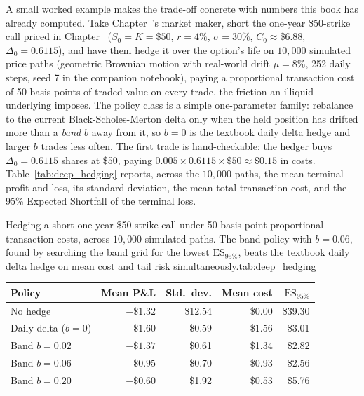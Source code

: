 \documentclass[../ai_in_finance]{subfiles}
\begin{document}
A small worked example makes the trade-off concrete with numbers this book has already computed. Take Chapter~'s market maker, short the one-year \$50-strike call priced in Chapter~ ($S_0=K=\$50$, $r=4\%$, $\sigma=30\%$, $C_0\approx\$6.88$, $\Delta_0=0.6115$), and have them hedge it over the option's life on $10{,}000$ simulated price paths (geometric Brownian motion with real-world drift $\mu=8\%$, 252 daily steps, seed 7 in the companion notebook), paying a proportional transaction cost of 50 basis points of traded value on every trade, the friction an illiquid underlying imposes. The policy class is a simple one-parameter family: rebalance to the current Black-Scholes-Merton delta only when the held position has drifted more than a \emph{band} $b$ away from it, so $b=0$ is the textbook daily delta hedge and larger $b$ trades less often. The first trade is hand-checkable: the hedger buys $\Delta_0=0.6115$ shares at \$50, paying $0.005 \times 0.6115 \times \$50 \approx \$0.15$ in costs. Table~\ref{tab:deep_hedging} reports, across the $10{,}000$ paths, the mean terminal profit and loss, its standard deviation, the mean total transaction cost, and the 95\% Expected Shortfall of the terminal loss.

\begin{booktable}{Hedging a short one-year \$50-strike call under 50-basis-point proportional transaction costs, across $10{,}000$ simulated paths. The band policy with $b=0.06$, found by searching the band grid for the lowest $\mathrm{ES}_{95\%}$, beats the textbook daily delta hedge on mean cost and tail risk simultaneously.}{tab:deep_hedging}
\begin{tabular}{lrrrr}
\toprule
Policy & Mean P\&L & Std.\ dev. & Mean cost & $\mathrm{ES}_{95\%}$ \\
\midrule
No hedge            & $-\$1.32$ & \$12.54 & \$0.00 & \$39.30 \\
Daily delta ($b=0$) & $-\$1.60$ & \$0.59  & \$1.56 & \$3.01  \\
Band $b=0.02$       & $-\$1.37$ & \$0.61  & \$1.34 & \$2.82  \\
Band $b=0.06$       & $-\$0.95$ & \$0.70  & \$0.93 & \$2.56  \\
Band $b=0.20$       & $-\$0.60$ & \$1.92  & \$0.53 & \$5.76  \\
\bottomrule
\end{tabular}
\end{booktable}
\end{document}

